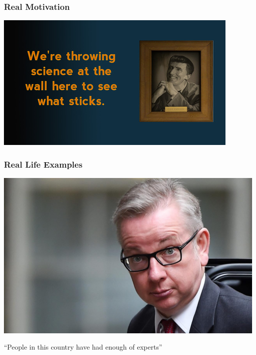 \documentclass{beamer}
\begin{document}
\begin{frame}
	\frametitle{Real Motivation}
	\href{run:./sound/Cave_Johnson_athletes.wav}{}
	\begin{center}
		\includegraphics[scale=0.5]{./images/cave_johnson.jpg}
	\end{center}
\end{frame}

\begin{frame}
	\frametitle{Real Life Examples}
	\begin{center}
		\includegraphics[scale=0.1]{./images/michael_gove.jpg}
	\end{center}
	\centering
	``People in this country have had enough of experts''
\end{frame}
\end{document}

